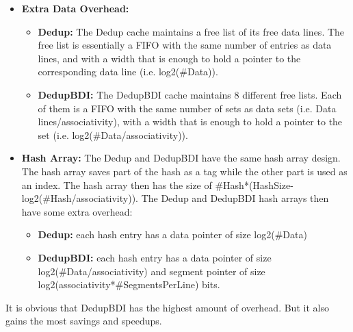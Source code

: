 \begin{itemize}
\begin{itemize}
    \end{itemize}
    \item \textbf{Extra Data Overhead:}
    \begin{itemize}
        \item \textbf{Dedup:} The Dedup cache maintains a free list of its free data lines. The free list is essentially a FIFO with the same number of entries as data lines, and with a width that is enough to hold a pointer to the corresponding data line (i.e. log2(\#Data)).
        \item \textbf{DedupBDI:} The DedupBDI cache maintains 8 different free lists. Each of them is a FIFO with the same number of sets as data sets (i.e. Data lines/associativity), with a width that is enough to hold a pointer to the set (i.e. log2(\#Data/associativity)).
    \end{itemize}
    \item \textbf{Hash Array:} The Dedup and DedupBDI have the same hash array design. The hash array saves part of the hash as a tag while the other part is used as an index. The hash array then has the size of \#Hash*(HashSize-log2(\#Hash/associativity)). The Dedup and DedupBDI hash arrays then have some extra overhead:
    \begin{itemize}
        \item \textbf{Dedup:} each hash entry has a data pointer of size log2(\#Data)
        \item \textbf{DedupBDI:} each hash entry has a data pointer of size log2(\#Data/associativity) and segment pointer of size log2(associativity*\#SegmentsPerLine) bits.
    \end{itemize}
\end{itemize}
It is obvious that DedupBDI has the highest amount of overhead. But it also gains the most savings and speedups.

